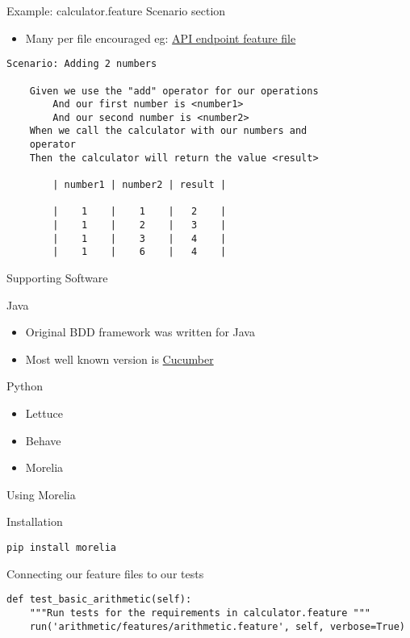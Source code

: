 \documentclass[bigger]{beamer}
\begin{document}
\begin{frame}[fragile,label={sec:orgcc4fe32}]{Example: calculator.feature Scenario section}
 \begin{itemize}
\item Many per file encouraged eg: \href{calculator/arithmetic/features/arithmetic.feature}{API endpoint feature file}
\end{itemize}

\scriptsize
\begin{verbatim}
Scenario: Adding 2 numbers

    Given we use the "add" operator for our operations
        And our first number is <number1>
        And our second number is <number2>
    When we call the calculator with our numbers and
    operator
    Then the calculator will return the value <result>

        | number1 | number2 | result |

        |    1    |    1    |   2    |
        |    1    |    2    |   3    |
        |    1    |    3    |   4    |
        |    1    |    6    |   4    |
\end{verbatim}
\end{frame}

\begin{frame}[label={sec:orgb4fd5e7}]{Supporting Software}
\begin{block}{Java}
\begin{itemize}
\item Original BDD framework was written for Java
\item Most well known version is \href{https:cucumber.io}{Cucumber}
\end{itemize}
\end{block}
\begin{block}{Python}
\begin{itemize}
\item Lettuce
\item Behave
\item Morelia
\end{itemize}
\end{block}
\end{frame}

\begin{frame}[fragile,label={sec:org9412043}]{Using Morelia}
 \begin{block}{Installation}
\begin{verbatim}
pip install morelia
\end{verbatim}
\end{block}
\begin{block}{Connecting our feature files to our tests}
\scriptsize
\begin{verbatim}
def test_basic_arithmetic(self):
    """Run tests for the requirements in calculator.feature """
    run('arithmetic/features/arithmetic.feature', self, verbose=True)
\end{verbatim}
\end{block}
\end{frame}
\end{document}
